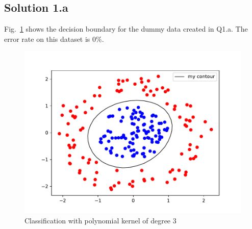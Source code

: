 \subsection*{Solution 1.a}
Fig.~\ref{fig:q1_a} shows the decision boundary for the dummy data created in Q1.a. The error rate on this dataset is $0\%$.
\begin{figure}[h!]
	\centering
	\includegraphics[scale=0.5]{q1_a_my_contour.pdf}
	\caption{Classification with polynomial kernel of degree $3$}
	\label{fig:q1_a}
\end{figure}
